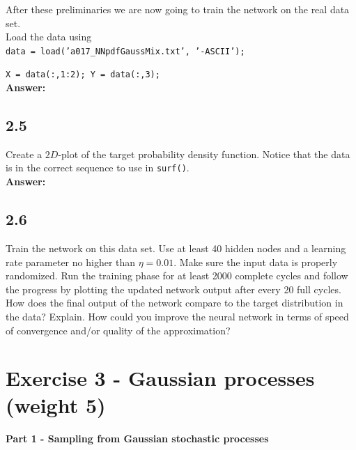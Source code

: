 \documentclass[a4paper]{article}
\begin{document}
After these preliminaries we are now going to train the network on the real data set.\\
Load the data using\\


\hspace{1cm} \texttt{data = load('a017\_NNpdfGaussMix.txt', '-ASCII');}

\hspace{1cm} \texttt{X = data(:,1:2); Y = data(:,3);}\\

\textbf{Answer:}\\






\subsection*{2.5}

Create a $2D$-plot of the target probability density function. Notice that the data is in the correct sequence to use in \texttt{surf()}.\\

\textbf{Answer:}\\








\subsection*{2.6}

Train the network on this data set. Use at least 40 hidden nodes and a learning rate parameter no higher than $\eta = 0.01$. Make sure the input data is properly randomized. Run the training phase for at least 2000 complete cycles and follow the progress by plotting the updated network output after every 20 full cycles. How does the final output of the network compare to the target distribution in the data? Explain. How could you improve the neural network in terms of speed of convergence and/or quality of the approximation?



\section*{Exercise 3 - Gaussian processes (weight 5)}


\textbf{Part 1 - Sampling from Gaussian stochastic processes}\\
\end{document}
